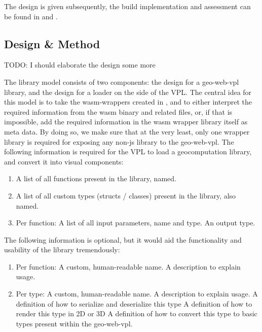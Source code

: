 The design is given subsequently, the build implementation and assessment can be found in  and .

\subsection{Design \& Method}

\begin{note}
 TODO: I should elaborate the design some more
\end{note}

The library model consists of two components: the design for a geo-web-vpl library, 
and the design for a loader on the side of the VPL. 
The central idea for this model is to take the wasm-wrappers created in , and to either interpret the required information from the wasm binary and related files, or, if that is impossible, add the required information in the wasm wrapper library itself as meta data.
By doing so, we make sure that at the very least, only one wrapper library is required for exposing any non-js library to the \ac{geo-web-vpl}.
The following information is required for the VPL to load a geocomputation library, and convert it into visual components:
\begin{enumerate}[-]
  \item A list of all functions present in the library, named.
  \item A list of all custom types (structs / classes) present in the library, also named.
  \item Per function:  
  \subitem A list of all input parameters, name and type.
  \subitem An output type.
\end{enumerate}

The following information is optional, but it would aid the functionality and usability of the library tremendously:
\begin{enumerate}[-]
  \item Per function:
  \subitem A custom, human-readable name.
  \subitem A description to explain usage.

  \item Per type:
  \subitem A custom, human-readable name.
  \subitem A description to explain usage.
  \subitem A definition of how to serialize and deserialize this type  
  \subitem A definition of how to render this type in 2D or 3D
  \subitem A definition of how to convert this type to basic types present within the geo-web-vpl.  
\end{enumerate}


